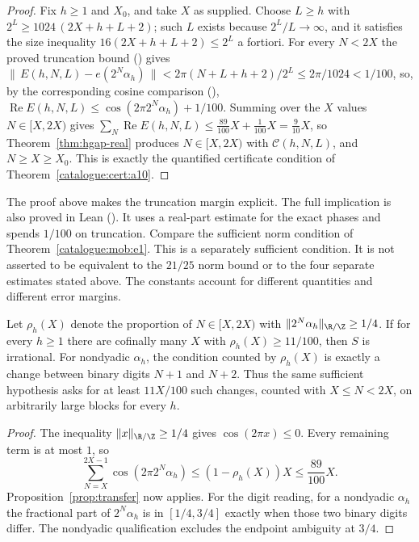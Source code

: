 \begin{proof}
Fix $h\ge 1$ and $X_0$, and take $X$ as supplied. Choose $L\ge h$ with
$2^{L}\ge 1024\,(2X+h+L+2)$; such $L$ exists because $2^L/L\to\infty$, and it
satisfies the size inequality $16(2X+h+L+2)\le 2^L$ a fortiori. For every
$N<2X$ the proved truncation bound
()
gives
$\bigl\|\,{E}(h,N,L)-e(2^N\alpha_h)\,\bigr\|
 < 2\pi(N+L+h+2)/2^{L} \le 2\pi/1024 < 1/100$,
so, by the corresponding cosine comparison
(),
$\operatorname{Re}E(h,N,L)\le \cos(2\pi 2^N\alpha_h)+1/100$. Summing over
the $X$ values $N\in[X,2X)$ gives
$\sum_N \operatorname{Re}E(h,N,L)\le \tfrac{89}{100}X+\tfrac{1}{100}X
=\tfrac{9}{10}X$, so Theorem~\ref{thm:hgap-real}
produces $N\in[X,2X)$ with $\mathcal{C}(h,N,L)$, and $N\ge X\ge X_0$.
This is exactly the quantified certificate condition of
Theorem~\ref{catalogue:cert:a10}.
\end{proof}

\noindent
The proof
above makes the truncation margin explicit. The full implication is also
proved in Lean
().
It uses a real-part estimate for the exact phases and spends $1/100$
on truncation. Compare the sufficient norm condition of
Theorem~\ref{catalogue:mob:e1}.
This is a separately sufficient condition. It is not asserted
to be equivalent to the $21/25$ norm bound or to the four separate
estimates stated above. The constants account for different
quantities and different error margins.

\begin{cor}\label{cor:digitform}
Let $\rho_h(X)$ denote the proportion of $N\in[X,2X)$ with
$\|2^N\alpha_h\|_{\R/\Z}\ge 1/4$. If for every $h\ge 1$ there are cofinally
many $X$ with $\rho_h(X)\ge 11/100$, then $S$ is irrational.
For nondyadic $\alpha_h$, the condition counted by $\rho_h(X)$ is
exactly a change between binary digits $N+1$ and $N+2$. Thus the same
sufficient hypothesis asks for at least $11X/100$ such changes, counted
with $X\le N<2X$, on arbitrarily large blocks for every $h$.
\end{cor}

\begin{proof}
The inequality $\|x\|_{\R/\Z}\ge1/4$ gives $\cos(2\pi x)\le0$.
Every remaining term is at most $1$, so
\[
 \sum_{N=X}^{2X-1}\cos(2\pi 2^N\alpha_h)
          \le(1-\rho_h(X))X\le\frac{89}{100}X.
\]
Proposition~\ref{prop:transfer} now applies. For the digit
reading, for a nondyadic $\alpha_h$ the fractional part of $2^N\alpha_h$
is in $[1/4,3/4]$ exactly when those two binary digits differ.
The nondyadic qualification excludes the endpoint ambiguity at $3/4$.
\end{proof}

